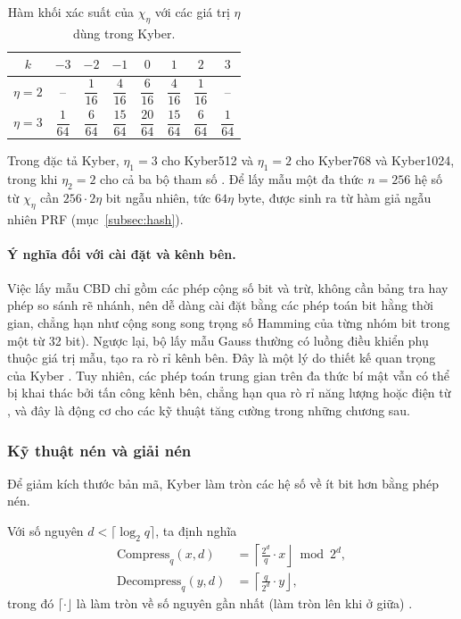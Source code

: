 \documentclass[../LuanVan.tex]{subfiles}
\begin{document}
\begin{table}[H]
\centering
\caption{Hàm khối xác suất của $\chi_\eta$ với các giá trị $\eta$ dùng trong Kyber.}
\label{tab:cbd}
{\renewcommand{\arraystretch}{2}
\begin{tabular}{c|ccccccc}
\hline
$k$ & $-3$ & $-2$ & $-1$ & $0$ & $1$ & $2$ & $3$ \\ \hline
$\eta=2$ & -- & $\dfrac{1}{16}$ & $\dfrac{4}{16}$ & $\dfrac{6}{16}$ & $\dfrac{4}{16}$ & $\dfrac{1}{16}$ & -- \\
$\eta=3$ & $\dfrac{1}{64}$ & $\dfrac{6}{64}$ & $\dfrac{15}{64}$ & $\dfrac{20}{64}$ & $\dfrac{15}{64}$ & $\dfrac{6}{64}$ & $\dfrac{1}{64}$ \\ \hline
\end{tabular}}
\end{table}

Trong đặc tả Kyber, $\eta_1=3$ cho Kyber512 và $\eta_1=2$ cho Kyber768 và Kyber1024, trong khi $\eta_2=2$ cho cả ba bộ tham số \cite{Avanzi21,FIPS203}. Để lấy mẫu một đa thức $n=256$ hệ số từ $\chi_\eta$ cần $256\cdot 2\eta$ bit ngẫu nhiên, tức $64\eta$ byte, được sinh ra từ hàm giả ngẫu nhiên PRF (mục~\ref{subsec:hash}).

\paragraph{Ý nghĩa đối với cài đặt và kênh bên.} Việc lấy mẫu CBD chỉ gồm các phép cộng số bit và trừ, không cần bảng tra hay phép so sánh rẽ nhánh, nên dễ dàng cài đặt bằng các phép toán bit hằng thời gian, chẳng hạn như cộng song song trọng số Hamming của từng nhóm bit trong một từ 32 bit). Ngược lại, bộ lấy mẫu Gauss thường có luồng điều khiển phụ thuộc giá trị mẫu, tạo ra rò rỉ kênh bên. Đây là một lý do thiết kế quan trọng của Kyber \cite{Bos18,Avanzi21}. Tuy nhiên, các phép toán trung gian trên đa thức bí mật vẫn có thể bị khai thác bởi tấn công kênh bên, chẳng hạn qua rò rỉ năng lượng hoặc điện từ \cite{Primas17,Ravi20}, và đây là động cơ cho các kỹ thuật tăng cường trong những chương sau.

\subsubsection{Kỹ thuật nén và giải nén}\label{subsec:compress}

Để giảm kích thước bản mã, Kyber làm tròn các hệ số về ít bit hơn bằng phép nén.

\begin{dn}
    Với số nguyên $d<\lceil\log_2 q\rceil$, ta định nghĩa
    \begin{align}
        \mathrm{Compress}_q(x,d) &= \left\lceil \frac{2^d}{q}\cdot x \right\rfloor \bmod 2^d,\\
        \mathrm{Decompress}_q(y,d) &= \left\lceil \frac{q}{2^d}\cdot y \right\rfloor,
    \end{align}
    trong đó $\lceil\cdot\rfloor$ là làm tròn về số nguyên gần nhất (làm tròn lên khi ở giữa) \cite{Avanzi21,FIPS203}.
\end{dn}
\end{document}
